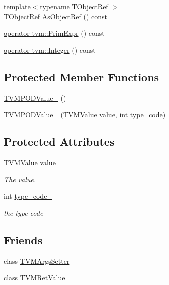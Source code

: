 \begin{DoxyCompactItemize}
\item 
{\footnotesize template$<$typename T\+Object\+Ref $>$ }\\T\+Object\+Ref \hyperlink{classtvm_1_1runtime_1_1TVMPODValue___a918b5a9ef8fcd65d649c7dd41ff12d9f}{As\+Object\+Ref} () const 
\item 
\hyperlink{classtvm_1_1runtime_1_1TVMPODValue___a5b321945a09aa94894d389cfd6a3e892}{operator tvm\+::\+Prim\+Expr} () const 
\item 
\hyperlink{classtvm_1_1runtime_1_1TVMPODValue___ad2089bfe768b39b214e098884d9da7c8}{operator tvm\+::\+Integer} () const 
\end{DoxyCompactItemize}
\subsection*{Protected Member Functions}
\begin{DoxyCompactItemize}
\item 
\hyperlink{classtvm_1_1runtime_1_1TVMPODValue___a2f46b59a6c1d5eb4575d7f583b5f1a0c}{T\+V\+M\+P\+O\+D\+Value\+\_\+} ()
\item 
\hyperlink{classtvm_1_1runtime_1_1TVMPODValue___afe1837bdbafe8341c2031c5cebcf6e74}{T\+V\+M\+P\+O\+D\+Value\+\_\+} (\hyperlink{unionTVMValue}{T\+V\+M\+Value} value, int \hyperlink{classtvm_1_1runtime_1_1TVMPODValue___a5a799e4197f227549cd641b0e753f9b8}{type\+\_\+code})
\end{DoxyCompactItemize}
\subsection*{Protected Attributes}
\begin{DoxyCompactItemize}
\item 
\hyperlink{unionTVMValue}{T\+V\+M\+Value} \hyperlink{classtvm_1_1runtime_1_1TVMPODValue___a8ffdfcc7099faf19ee07a5c03ce06af8}{value\+\_\+}
\begin{DoxyCompactList}\small\item\em The value. \end{DoxyCompactList}\item 
int \hyperlink{classtvm_1_1runtime_1_1TVMPODValue___aed3e983e990c5c4ed3ac09b95055297e}{type\+\_\+code\+\_\+}
\begin{DoxyCompactList}\small\item\em the type code \end{DoxyCompactList}\end{DoxyCompactItemize}
\subsection*{Friends}
\begin{DoxyCompactItemize}
\item 
class \hyperlink{classtvm_1_1runtime_1_1TVMPODValue___a35ae555d4becf356b16aeacd353d41ee}{T\+V\+M\+Args\+Setter}
\item 
class \hyperlink{classtvm_1_1runtime_1_1TVMPODValue___ae0ea8b4adc6dab8c74086bceaef6b3e1}{T\+V\+M\+Ret\+Value}
\end{DoxyCompactItemize}


